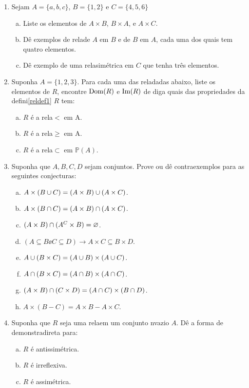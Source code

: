 \begin{enumerate}[{\bf 1.}]
\item Sejam $A=\{a,b,c\}$, $B=\{1,2\}$ e $C=\{4,5,6\}$
\begin{enumerate}[a)]
\item Liste os elementos de $A\times B$, $B\times A$, e $A\times C$.
\item D\^e exemplos de rela\coes de $A$ em $B$ e de $B$ em $A$, cada uma dos quais tem quatro elementos.
\item D\^e exemplo de uma rela\cao sim\'etrica em $C$ que tenha tr\^es elementos.
\end{enumerate}

\item Suponha $A=\{1,2,3\}$. Para cada uma das rela\coes dadas abaixo, liste os elementos de $R$, encontre $\operatorname{Dom}(R)$ e $\operatorname{Im}(R)$ de diga quais das propriedades da defini\cao \ref{reldef1} $R$ tem:
\begin{enumerate}[a)]
\item $R$ \'e a rela\cao $<$ em A. 
\item $R$ \'e a rela\cao $\geq$ em A.
\item $R$ \'e a rela\cao $\subset$ em $\mathbb{P}(A)$.
\end{enumerate}

\item Suponha que $A,B,C,D$ sejam conjuntos. Prove ou d\^e contraexemplos para as seguintes conjecturas:
\begin{enumerate}[a)]
\item $A\times(B\cup C)= (A\times B)\cup(A\times C)$.
\item $A\times(B\cap C)=(A\times B)\cap(A\times C)$.
\item $(A\times B)\cap(A^C\times B)=\varnothing$.
\item $(A\subseteq B\ee C\subseteq D)\to A\times C\subseteq B\times D$.
\item $A\cup(B\times C)=(A\cup B)\times(A\cup C)$.
\item $A\cap(B\times C)=(A\cap B)\times(A\cap C)$.
\item $(A\times B)\cap(C\times D)=(A\cap C)\times(B\cap D)$.
\item $A\times(B-C)=A\times B-A\times C$.
\end{enumerate}

\item Suponha que $R$ seja uma rela\cao em um conjunto n\ao vazio $A$. D\^e a forma de demonstra\cao direta para:
\begin{enumerate}[a)]
\item $R$ \'e antissim\'etrica.
\item $R$ \'e irreflexiva.
\item $R$ \'e assim\'etrica.
\end{enumerate}


\end{enumerate}
